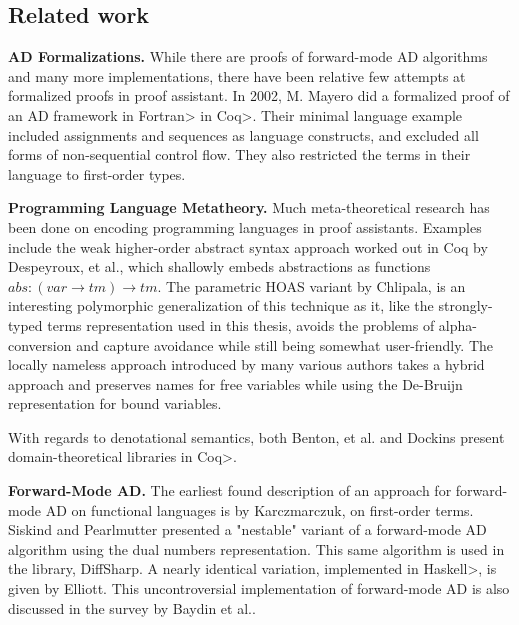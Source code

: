 \subsection{Related work}\label{sec:related-work}
\textbf{AD Formalizations.} While there are proofs of forward-mode AD algorithms\cite{huot2020correctness}\cite{barthe2020versatility} and many more implementations\cite{Shaikha2019}\cite{Margossian2019ARO}, there have been relative few attempts at formalized proofs in proof assistant.
In 2002, M. Mayero did a formalized proof of an AD framework in \<Fortran> in \<Coq>\cite{Mayero:CorrectnessProofAD}.
Their minimal language example included assignments and sequences as language constructs, and excluded all forms of non-sequential control flow.
They also restricted the terms in their language to first-order types.

\textbf{Programming Language Metatheory.} Much meta-theoretical research has been done on encoding programming languages in proof assistants\cite{Aydemir2005}.
Examples include the weak higher-order abstract syntax approach worked out in Coq by Despeyroux, et al.\cite{10.1007/BFb0014049}, which shallowly embeds abstractions as functions $abs : (var \to tm) \to tm$.
The parametric HOAS variant by Chlipala\cite{10.1145/1411204.1411226}, is an interesting polymorphic generalization of this technique as it, like the strongly-typed terms representation used in this thesis, avoids the problems of alpha-conversion and capture avoidance while still being somewhat user-friendly.
The locally nameless approach introduced by many various authors\cite{McKinna_Pollack_1997}\cite{10.1007/3-540-57826-9_152}\cite{10.1145/1017472.1017477} takes a hybrid approach and preserves names for free variables while using the De-Bruijn representation for bound variables.

With regards to denotational semantics, both Benton, et al.\cite{Benton2009} and Dockins\cite{Dockins2014} present domain-theoretical libraries in \<Coq>.

\textbf{Forward-Mode AD.}
The earliest found description of an approach for forward-mode AD on functional languages is by Karczmarczuk\cite{Karczmarczuk98functionaldifferentiation}, on first-order terms.
Siskind and Pearlmutter presented a "nestable" variant of a forward-mode AD algorithm using the dual numbers representation.
This same algorithm is used in the \FS{} library, DiffSharp\cite{Baydin2015AutomaticDI}.
A nearly identical variation, implemented in \<Haskell>, is given by Elliott\cite{Elliott2009-beautiful-differentiation}.
This uncontroversial implementation of forward-mode AD is also discussed in the survey by Baydin et al.\cite{Baydin2015AutomaticDI}.

